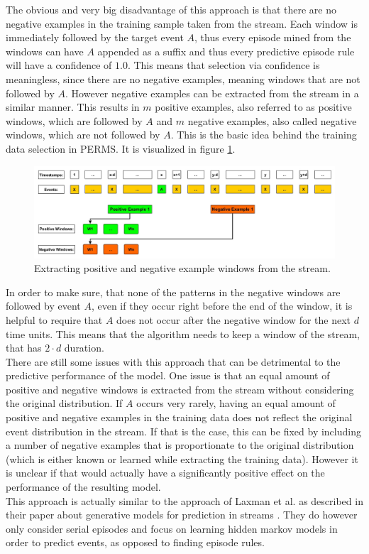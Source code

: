 The obvious and very big disadvantage of this approach is that there are no negative examples in the training sample taken from the stream. Each window is immediately followed by the target event $A$, thus every episode mined from the windows can have $A$ appended as a suffix and thus every predictive episode rule will have a confidence of $1.0$. This means that selection via confidence is meaningless, since there are no negative examples, meaning windows that are not followed by $A$. However negative examples can be extracted from the stream in a similar manner. This results in $m$ positive examples, also referred to as positive windows, which are followed by $A$ and $m$ negative examples, also called negative windows, which are not followed by $A$. This is the basic idea behind the training data selection in PERMS. It is visualized in figure \ref{fig_trainingDataPositiveAndNegativeWindows}. 

\begin{figure}[h]
	\centering
  	\includegraphics[width=\textwidth]{trainingDataPositiveAndNegativeWindows}
	\caption{Extracting positive and negative example windows from the stream.}
	\label{fig_trainingDataPositiveAndNegativeWindows}
\end{figure}

In order to make sure, that none of the patterns in the negative windows are followed by event $A$, even if they occur right before the end of the window, it is helpful to require that $A$ does not occur after the negative window for the next $d$ time units. This means that the algorithm needs to keep a window of the stream, that has $2\cdot d$ duration.\\
There are still some issues with this approach that can be detrimental to the predictive performance of the model. One issue is that an equal amount of positive and negative windows is extracted from the stream without considering the original distribution. If $A$ occurs very rarely, having an equal amount of positive and negative examples in the training data does not reflect the original event distribution in the stream. If that is the case, this can be fixed by including a number of negative examples that is proportionate to the original distribution (which is either known or learned while extracting the training data). However it is unclear if that would actually have a significantly positive effect on the performance of the resulting model. \\
This approach is actually similar to the approach of Laxman et al. as described in their paper about generative models for prediction in streams \cite{laxman2008stream}. They do however only consider serial episodes and focus on learning hidden markov models in order to predict events, as opposed to finding episode rules.

